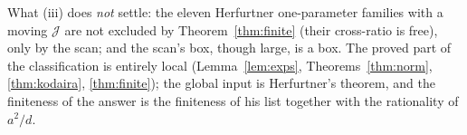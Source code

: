 \begin{remark}
What (iii) does \emph{not} settle: the eleven Herfurtner one-parameter families
with a moving $\mathcal J$ are not excluded by Theorem~\ref{thm:finite}
(their cross-ratio is free), only by the scan; and the scan's box, though large,
is a box. The proved part of the classification is entirely local
(Lemma~\ref{lem:exps}, Theorems~\ref{thm:norm}, \ref{thm:kodaira},
\ref{thm:finite}); the global input is Herfurtner's theorem, and the finiteness of
the answer is the finiteness of his list together with the rationality of
$a^2/d$.
\end{remark}
